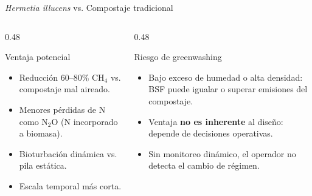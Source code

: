 \documentclass[aspectratio=169, 11pt]{beamer}
\newcommand{\BSF}{\textit{Hermetia illucens}}
\begin{document}
\begin{frame}{\BSF{} vs. Compostaje tradicional}
    \begin{columns}[T]
        \begin{column}{0.48\textwidth}
            \begin{block}{Ventaja potencial}
                \begin{itemize}
                    \item Reducci\'{o}n 60--80\% CH$_4$ vs. compostaje mal aireado.
                    \item Menores p\'{e}rdidas de N como N$_2$O (N incorporado a biomasa).
                    \item Bioturbaci\'{o}n din\'{a}mica vs. pila est\'{a}tica.
                    \item Escala temporal m\'{a}s corta.
                \end{itemize}
            \end{block}
        \end{column}
        \begin{column}{0.48\textwidth}
            \begin{alertblock}{Riesgo de greenwashing}
                \begin{itemize}
                    \item Bajo exceso de humedad o alta densidad: BSF puede igualar o superar emisiones del compostaje.
                    \item Ventaja \textbf{no es inherente} al dise\~{n}o: depende de decisiones operativas.
                    \item Sin monitoreo din\'{a}mico, el operador no detecta el cambio de r\'{e}gimen.
                \end{itemize}
            \end{alertblock}
        \end{column}
    \end{columns}
\end{frame}
\end{document}
